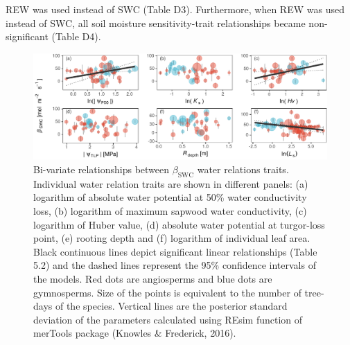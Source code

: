 \documentclass[11pt,twoside]{reedthesis}
\begin{document}
REW was used instead of SWC (Table D3). Furthermore, when REW was used
instead of SWC, all soil moisture sensitivity-trait relationships became
non-significant (Table D4).\par
\begin{figure}[hbt!]

{\centering \includegraphics[width=1\linewidth]{figure/CH5/Figure_5} 

}

\caption[Bi-variate relationships between $\beta_{\text{SWC}}$ water relations traits.]{Bi-variate relationships between $\beta_{\text{SWC}}$ water relations traits. Individual water relation traits are shown in different panels: (a) logarithm of absolute water potential at 50\% water conductivity loss, (b) logarithm of maximum sapwood water conductivity, (c) logarithm of Huber value, (d) absolute water potential at turgor-loss point, (e) rooting depth and (f) logarithm of individual leaf area. Black continuous lines depict significant linear relationships (Table 5.2) and the dashed lines represent the 95\% confidence intervals of the models. Red dots are angiosperms and blue dots are gymnosperms. Size of the points is equivalent to the number of tree-days of the species. Vertical lines are the posterior standard deviation of the parameters calculated using REsim function of merTools package (Knowles \& Frederick, 2016).}\label{fig:ch5fig5}
\end{figure}
\end{document}
